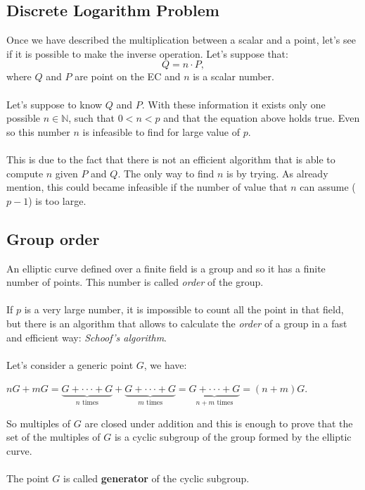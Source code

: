 \subsection{Discrete Logarithm Problem}
Once we have described the multiplication between a scalar and a point, let's see if it is possible to make the inverse operation. Let's suppose that:
\begin{equation*}
Q = n \cdot P,
\end{equation*}
where $Q$ and $P$ are point on the EC and $n$ is a scalar number. 
\\ \\ 
Let's suppose to know $Q$ and $P$. With these information it exists only one possible $n \in \mathbb{N}$, such that $0<n<p$ and that the equation above holds true. Even so this number $n$ is infeasible to find for large value of $p$.
\\ \\
This is due to the fact that there is not an efficient algorithm that is able to compute $n$ given $P$ and $Q$. The only way to find $n$ is by trying. As already mention, this could became infeasible if the number of value that $n$ can assume ($p-1$) is too large.

\subsection{Group order}
An elliptic curve defined over a finite field is a group and so it has a finite number of points. This number is called \textit{order} of the group.
\\ \\
If $p$ is a very large number, it is impossible to count all the point in that field, but there is an algorithm that allows to calculate the \textit{order} of a group in a fast and efficient way: \textit{Schoof's algorithm}.
\\ \\
Let's consider a generic point $G$, we have:
\begin{center} 
	$ nG+mG=\underbrace{
		G+\cdot \cdot \cdot+G
	}_{n\text{ times}}+
	\underbrace{
		G+\cdot \cdot \cdot+G
	}_{m\text{ times}}=
	\underbrace{
		G+\cdot \cdot \cdot+G
	}_{n+m\text{ times}} = 
	(n+m)G$.
\end{center}
So multiples of $G$ are closed under addition and this is enough to prove that the set of the multiples of $G$ is a cyclic subgroup of the group formed by the elliptic curve.
\\ \\
The point $G$ is called \textbf{generator} of the cyclic subgroup.


